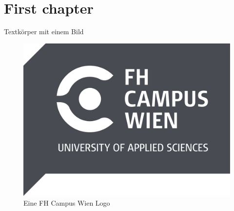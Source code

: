 \chapter{First chapter}
Textkörper mit einem Bild

\begin{figure}[htbp]
    \centering
    \includegraphics{images/logo}
    \caption{Eine FH Campus Wien Logo}
    \label{fig:birne}
\end{figure}
